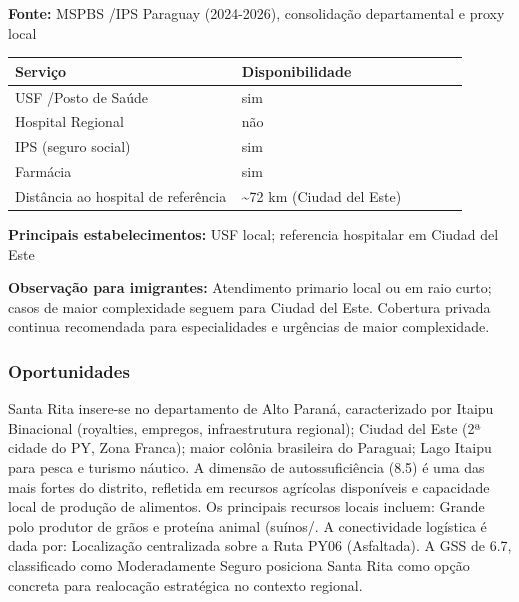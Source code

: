 \textbf{Fonte:} MSPBS /\allowbreak  IPS Paraguay (2024-2026), consolidação
departamental e proxy local

{\def\LTcaptype{none} %
\begin{longtable}{@{}>{\raggedright\arraybackslash}p{0.45\linewidth} >{\raggedright\arraybackslash}p{0.45\linewidth}@{}}
\toprule\noalign{}
Serviço & Disponibilidade \\
\midrule\noalign{}
\endhead
\bottomrule\noalign{}
\endlastfoot
USF /\allowbreak  Posto de Saúde & sim \\
Hospital Regional & não \\
IPS (seguro social) & sim \\
Farmácia & sim \\
Distância ao hospital de referência & \textasciitilde72 km (Ciudad del
Este) \\
\end{longtable}
}

\textbf{Principais estabelecimentos:} USF local; referencia hospitalar
em Ciudad del Este

\textbf{Observação para imigrantes:} Atendimento primario local ou em
raio curto; casos de maior complexidade seguem para Ciudad del Este.
Cobertura privada continua recomendada para especialidades e urgências
de maior complexidade.
\newpage

\subsubsection*{Oportunidades}\label{oport-santa-rita-1013}
Santa Rita insere-se no departamento de Alto Paraná, caracterizado por Itaipu Binacional (royalties, empregos, infraestrutura regional); Ciudad del Este (2ª cidade do PY, Zona Franca); maior colônia brasileira do Paraguai; Lago Itaipu para pesca e turismo náutico. A dimensão de autossuficiência (8.5) é uma das mais fortes do distrito, refletida em recursos agrícolas disponíveis e capacidade local de produção de alimentos. Os principais recursos locais incluem: Grande polo produtor de grãos e proteína animal (suínos/. A conectividade logística é dada por: Localização centralizada sobre a Ruta PY06 (Asfaltada). A GSS de 6.7, classificado como Moderadamente Seguro posiciona Santa Rita como opção concreta para realocação estratégica no contexto regional.


